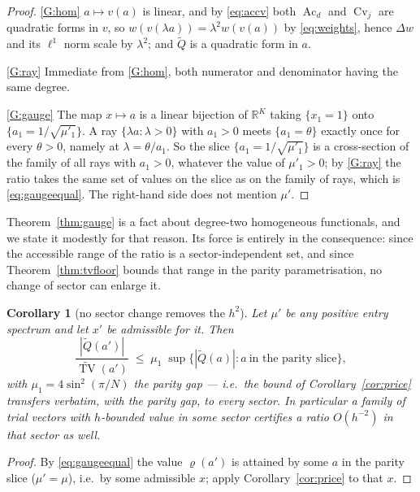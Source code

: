 \documentclass[11pt,a4paper]{article}
\theoremstyle{plain}
\newtheorem{corollary}[theorem]{Corollary}
\theoremstyle{definition}
\newcommand{\R}{\mathbb{R}}
\newcommand{\TV}{\operatorname{TV}}
\newcommand{\Ac}{\operatorname{Ac}}
\newcommand{\Cv}{\operatorname{Cv}}
\begin{document}
\begin{proof}
\ref{G:hom} $a\mapsto v(a)$ is linear, and by \eqref{eq:accv} both $\Ac_d$ and
$\Cv_j$ are quadratic forms in $v$, so $w(v(\lambda a))=\lambda^{2}w(v(a))$ by
\eqref{eq:weights}, hence $\Delta w$ and its $\ell^{1}$ norm scale by
$\lambda^{2}$; and $\widetilde Q$ is a quadratic form in $a$.

\ref{G:ray} Immediate from \ref{G:hom}, both numerator and denominator having
the same degree.

\ref{G:gauge} The map $x\mapsto a$ is a linear bijection of $\R^{K}$ taking
$\{x_1=1\}$ onto $\{a_1=1/\sqrt{\mu'_1}\}$. A ray $\{\lambda a:\lambda>0\}$ with
$a_1>0$ meets $\{a_1=\theta\}$ exactly once for every $\theta>0$, namely at
$\lambda=\theta/a_1$. So the slice $\{a_1=1/\sqrt{\mu'_1}\}$ is a
cross-section of the family of all rays with $a_1>0$, whatever the value of
$\mu'_1>0$; by \ref{G:ray} the ratio takes the same set of values on the slice
as on the family of rays, which is \eqref{eq:gaugeequal}. The right-hand side
does not mention $\mu'$.
\end{proof}

Theorem~\ref{thm:gauge} is a fact about degree-two homogeneous functionals, and
we state it modestly for that reason. Its force is entirely in the
consequence: since the accessible range of the ratio is a sector-independent
set, and since Theorem~\ref{thm:tvfloor} bounds that range in the parity
parametrisation, no change of sector can enlarge it.

\begin{corollary}[no sector change removes the $h^{2}$]
\label{cor:noescape}
Let $\mu'$ be any positive entry spectrum and let $x'$ be admissible for it.
Then
\begin{equation}
\label{eq:noescape}
  \frac{|\widetilde Q(a')|}{\widetilde{\TV}(a')}
  \;\le\;\mu_1\;\sup\bigl\{|\widetilde Q(a)|:a\ \text{in the parity slice}\bigr\},
\end{equation}
with $\mu_1=4\sin^{2}(\pi/N)$ the parity gap --- i.e.\ the bound of
Corollary~\ref{cor:price} transfers verbatim, with the \emph{parity} gap, to
every sector. In particular a family of trial vectors with $h$-bounded value in
some sector certifies a ratio $O(h^{-2})$ in that sector as well.
\end{corollary}

\begin{proof}
By \eqref{eq:gaugeequal} the value $\varrho(a')$ is attained by some $a$ in the
parity slice ($\mu'=\mu$), i.e.\ by some admissible $x$; apply
Corollary~\ref{cor:price} to that $x$.
\end{proof}
\end{document}
